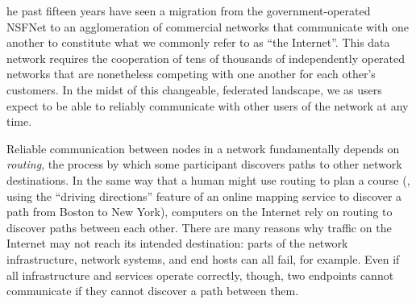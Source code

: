 

 \label{chap:intro}




he past fifteen years have seen a migration from the
government-operated NSFNet to an agglomeration of commercial networks
that communicate with one another to constitute what we commonly refer
to as ``the Internet''.  This data network requires the cooperation of
tens of thousands of independently operated networks that are
nonetheless competing with one another for each other's customers.  In
the midst of this changeable, federated landscape, we as users expect to
be able to reliably communicate with other users of the network at any
time.

Reliable communication between nodes in a network fundamentally depends
on {\em routing}, the process by which some participant discovers paths
to other network destinations.  In the same way that a human might use
routing to plan a course (\eg, using the ``driving directions'' feature
of an online mapping service to discover a path from Boston to New
York), computers on the Internet rely on routing to discover paths
between each other.  There are many reasons why traffic on the Internet
may not reach its intended destination: parts of the network
infrastructure, network systems, and end hosts can all fail, for
example.  Even if all infrastructure and services operate correctly,
though, two endpoints cannot communicate if they cannot discover a path
between them. 

